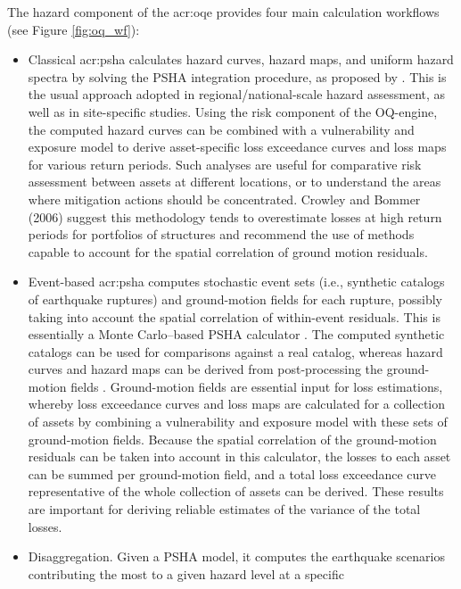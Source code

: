 The hazard component of the \gls{acr:oqe} provides four main calculation 
workflows (see Figure \ref{fig:oq_wf}):
\begin{itemize}
\item Classical \gls{acr:psha} calculates hazard curves, hazard maps, 
    and uniform hazard spectra by solving the PSHA integration procedure, 
    as proposed by \textcite{field2003}. 
    This is the usual approach adopted in regional/national-scale hazard 
    assessment, as well as in site-specific studies. Using the risk 
    component of the OQ-engine, the computed hazard curves can be 
    combined with a vulnerability and exposure model to derive 
    asset-specific loss exceedance curves and loss maps for various 
    return periods. Such analyses are useful for comparative risk 
    assessment between assets at different locations, or to understand
    the areas where mitigation actions should be concentrated. 
    Crowley and Bommer (2006) suggest this methodology tends to 
    overestimate losses at high return periods for portfolios of 
    structures and recommend the use of methods capable to account 
    for the spatial correlation of ground motion residuals.
\item Event-based \gls{acr:psha} computes stochastic event sets (i.e., 
    synthetic catalogs of earthquake ruptures) and ground-motion fields 
    for each rupture, possibly taking into account the spatial 
    correlation of within-event residuals. This is essentially a 
    Monte Carlo–based PSHA calculator \parencite[e.g.][]{musson2000}. The computed 
    synthetic catalogs can be used for comparisons against a real 
    catalog, whereas hazard curves and hazard maps can be derived from 
    post-processing the ground-motion fields \parencite{ebel1999}. 
    Ground-motion fields are essential input for loss estimations, 
    whereby loss exceedance curves and loss maps are calculated for 
    a collection of assets by combining a vulnerability and exposure
    model with these sets of ground-motion fields. Because the spatial
    correlation of the ground-motion residuals can be taken into account
    in this calculator, the losses to each asset can be summed per 
    ground-motion field, and a total loss exceedance curve representative 
    of the whole collection of assets can be derived. These results are 
    important for deriving reliable estimates of the variance of the
    total losses.
\item Disaggregation. Given a PSHA model, it computes the earthquake
    scenarios contributing the most to a given hazard level at a specific

\end{itemize}

